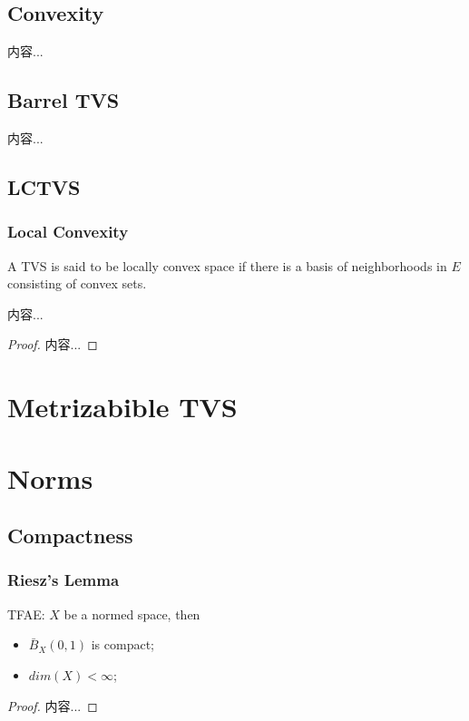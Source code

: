 \documentclass[Total.tex]{subfiles}
\begin{document}
			\subsection{Convexity}
				\begin{Def}
					内容...
				\end{Def}
			\subsection{Barrel TVS}
				\begin{Def}
					内容...
				\end{Def}
			\subsection{LCTVS}
				\subsubsection{Local Convexity}
				\begin{Def}
					A TVS is said to be locally convex space if there is a basis of neighborhoods in $E$ consisting of convex sets.
				\end{Def}
				\begin{proposition}
					内容...
				\end{proposition}
				\begin{proof}
					内容...
				\end{proof}
		\section{Metrizabible TVS}
		\section{Norms}
			\subsection{Compactness}
			\subsubsection{Riesz's Lemma}
				\begin{theorem}
					TFAE: $X$ be a normed space, then
					\begin{itemize}
						\item $\bar{B}_X(0,1)$ is compact;
						\item $dim(X)<\infty$;
					\end{itemize}
				\end{theorem}
				\begin{proof}
					内容...
				\end{proof}
				
\end{document}
